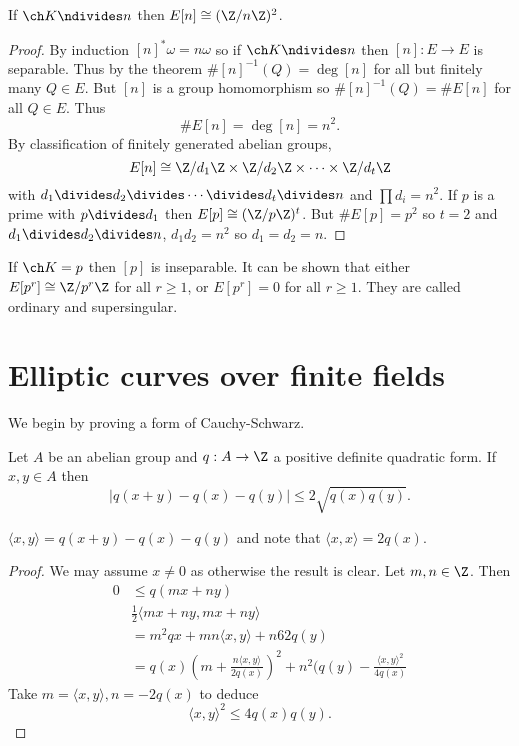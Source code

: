 \documentclass[a4paper]{article}
\theoremstyle{definition}
\theoremstyle{theorem}
\begin{document}
\begin{theorem}
  If \(\ch K \ndivides n\) then \(E[n] \cong (\Z/n\Z)^2\).
\end{theorem}

\begin{proof}
  By induction \([n]^*\omega = n\omega\) so if \(\ch K \ndivides n\) then \([n]: E \to E\) is separable. Thus by the theorem \(\# [n]^{-1}(Q) = \deg [n]\) for all but finitely many \(Q \in E\). But \([n]\) is a group homomorphism so \(\#[n]^{-1}(Q) = \# E[n]\) for all \(Q \in E\). Thus
  \[
    \# E[n] = \deg [n] = n^2.
  \]
  By classification of finitely generated abelian groups,
  \[
    E[n] \cong \Z/d_1\Z \times \Z/d_2\Z \times \cdots \times \Z/d_t\Z
  \]
  with \(d_1 \divides d_2 \divides \cdots \divides d_t \divides n\) and \(\prod d_i = n^2\). If \(p\) is a prime with \(p \divides d_1\) then \(E[p] \cong (\Z/p\Z)^t\). But \(\#E[p] = p^2\) so \(t = 2\) and \(d_1 \divides d_2 \divides n\), \(d_1d_2 = n^2\) so \(d_1 = d_2 = n\).
\end{proof}

\begin{remark}
  If \(\ch K = p\) then \([p]\) is inseparable. It can be shown that either \(E[p^r] \cong \Z/p^r\Z\) for all \(r \geq 1\), or \(E[p^r] = 0\) for all \(r \geq 1\). They are called ordinary and supersingular.
\end{remark}

\section{Elliptic curves over finite fields}

We begin by proving a form of Cauchy-Schwarz.

\begin{lemma}
  Let \(A\) be an abelian group and \(q: A \to \Z\) a positive definite quadratic form. If \(x, y \in A\) then
  \[
    |q(x + y) - q(x) - q(y)| \leq 2 \sqrt{q(x) q(y)}.
  \]
\end{lemma}

\begin{notation}
  \(\langle x, y \rangle = q(x + y) - q(x) - q(y)\) and note that \(\langle x, x \rangle = 2q(x)\).
\end{notation}

\begin{proof}
  We may assume \(x \neq 0\) as otherwise the result is clear. Let \(m, n \in \Z\). Then
  \begin{align*}
    0 &\leq q(mx + ny) \\
      & \frac{1}{2} \langle mx + ny, mx + ny \rangle \\
      &= m^2 qx + mn \langle x, y \rangle + n62 q(y) \\
      &= q(x) (m + \frac{n \langle x, y \rangle}{2q(x)})^2 + n^2 (q(y) - \frac{\langle x, y\rangle^2}{4q(x)}
  \end{align*}
  Take \(m = \langle x, y \rangle, n = -2q(x)\) to deduce
  \[
    \langle x, y \rangle^2 \leq 4q(x)q(y).
  \]
\end{proof}
\end{document}
